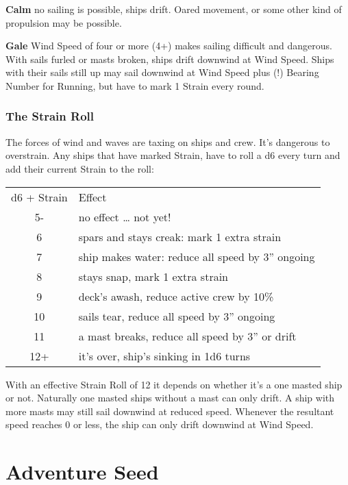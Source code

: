 \documentclass[11pt]{wbzine}
\begin{document}
\begin{multicols}{2}
\textbf{Calm} no sailing is possible, ships drift. Oared movement, or
some other kind of propulsion may be possible.

\textbf{Gale} Wind Speed of four or more (4+) makes sailing difficult
and dangerous. With sails furled or masts broken, ships drift downwind
at Wind Speed. Ships with their sails still up may sail downwind at Wind
Speed plus (!) Bearing Number for Running, but have to mark 1 Strain
every round.

\subsubsection{The Strain Roll}

The forces of wind and waves are taxing on ships and crew. It's
dangerous to overstrain. Any ships that have marked Strain, have to roll
a d6 every turn and add their current Strain to the roll:

\begin{tabularx}{\columnwidth}{cZ}
d6 + Strain & Effect \\
5- & no effect \ldots{} not yet! \\
6 & spars and stays creak: mark 1 extra strain \\
7 & ship makes water: reduce all speed by 3'' ongoing \\
8 & stays snap, mark 1 extra strain \\
9 & deck's awash, reduce active crew by 10\% \\
10 & sails tear, reduce all speed by 3'' ongoing \\
11 & a mast breaks, reduce all speed by 3'' or drift \\
12+ & it's over, ship's sinking in 1d6 turns \\
\end{tabularx}

With an effective Strain Roll of 12 it depends on whether it's a one
masted ship or not. Naturally one masted ships without a mast can only
drift. A ship with more masts may still sail downwind at reduced speed.
Whenever the resultant speed reaches 0 or less, the ship can only drift
downwind at Wind Speed.


\section{Adventure Seed}

\end{multicols}


\end{document}
